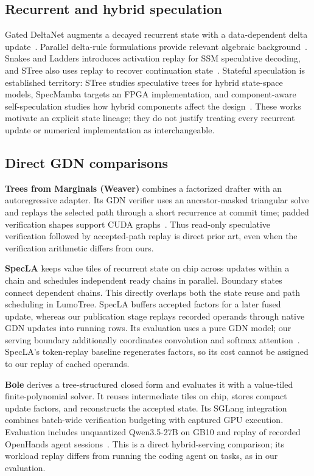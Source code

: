 \documentclass[conference]{IEEEtran}
\newcommand{\sys}{LumoTree}
\begin{document}
\subsection{Recurrent and hybrid speculation}
Gated DeltaNet augments a decayed recurrent state with a data-dependent delta update~\cite{yang2024gated}. Parallel delta-rule formulations provide relevant algebraic background~\cite{yang2024delta}. Snakes and Ladders introduces activation replay for SSM speculative decoding, and STree also uses replay to recover continuation state~\cite{wu2024snakes,wu2025stree}. Stateful speculation is established territory: STree studies speculative trees for hybrid state-space models, SpecMamba targets an FPGA implementation, and component-aware self-speculation studies how hybrid components affect the design~\cite{wu2025stree,zhong2025specmamba,borobia2026component}. These works motivate an explicit state lineage; they do not justify treating every recurrent update or numerical implementation as interchangeable.

\subsection{Direct GDN comparisons}
\textbf{Trees from Marginals (Weaver)} combines a factorized drafter with an autoregressive adapter. Its GDN verifier uses an ancestor-masked triangular solve and replays the selected path through a short recurrence at commit time; padded verification shapes support CUDA graphs~\cite{oda2026marginals}. Thus read-only speculative verification followed by accepted-path replay is direct prior art, even when the verification arithmetic differs from ours.

\textbf{SpecLA} keeps value tiles of recurrent state on chip across updates within a chain and schedules independent ready chains in parallel. Boundary states connect dependent chains. This directly overlaps both the state reuse and path scheduling in \sys{}. SpecLA buffers accepted factors for a later fused update, whereas our publication stage replays recorded operands through native GDN updates into running rows. Its evaluation uses a pure GDN model; our serving boundary additionally coordinates convolution and softmax attention~\cite{wang2026specla}. SpecLA's token-replay baseline regenerates factors, so its cost cannot be assigned to our replay of cached operands.

\textbf{Bole} derives a tree-structured closed form and evaluates it with a value-tiled finite-polynomial solver. It reuses intermediate tiles on chip, stores compact update factors, and reconstructs the accepted state. Its SGLang integration combines batch-wide verification budgeting with captured GPU execution. Evaluation includes unquantized Qwen3.5-27B on GB10 and replay of recorded OpenHands agent sessions~\cite{wang2026bole}. This is a direct hybrid-serving comparison; its workload replay differs from running the coding agent on tasks, as in our evaluation.
\end{document}
